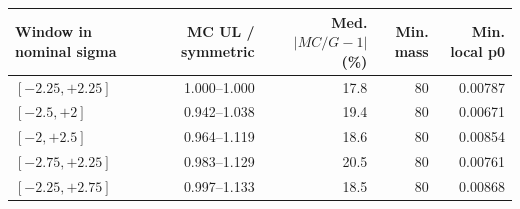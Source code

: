 \begin{tabular}{lrrrr}
\toprule
Window in nominal sigma & MC UL / symmetric & Med. $|MC/G-1|$ (\%) & Min. mass & Min. local p0 \\
\midrule
$[-2.25,+2.25]$ & 1.000--1.000 & 17.8 & 80 & 0.00787 \\
$[-2.5,+2]$ & 0.942--1.038 & 19.4 & 80 & 0.00671 \\
$[-2,+2.5]$ & 0.964--1.119 & 18.6 & 80 & 0.00854 \\
$[-2.75,+2.25]$ & 0.983--1.129 & 20.5 & 80 & 0.00761 \\
$[-2.25,+2.75]$ & 0.997--1.133 & 18.5 & 80 & 0.00868 \\
\bottomrule
\end{tabular}
